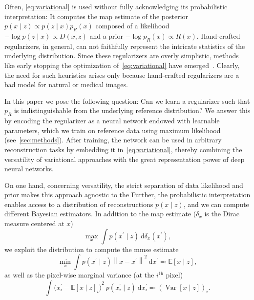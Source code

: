 \documentclass[twocolumn]{article}
\newcommand{\norm}[1]{\left\lVert#1\right\rVert}
\begin{document}
Often, \cref{eq:variational} is used without fully acknowledging its probabilistic interpretation:
It computes the \gls{map} estimate of the posterior \( p(x\mid z) \propto p(z \mid x) p_R(x) \) composed of a likelihood \( -\log p(z \mid x) \propto D(x, z) \) and a prior \( -\log p_R(x) \propto R(x) \).
Hand-crafted regularizers, in general, can not faithfully represent the intricate statistics of the underlying distribution.
Since these regularizers are overly simplistic, methods like early stopping the optimization of~\cref{eq:variational} have emerged~\cite{kobler_total_2020}.
Clearly, the need for such heuristics arises only because hand-crafted regularizers are a bad model for natural or medical images.

In this paper we pose the following question:
Can we learn a regularizer such that \( p_R \) is indistinguishable from the underlying reference distribution?
We answer this by encoding the regularizer as a neural network endowed with learnable parameters, which we train on reference data using maximum likelihood (see~\cref{sec:methods}).
After training, the network can be used in arbitrary reconstruction tasks by embedding it in~\cref{eq:variational}, thereby combining the versatility of variational approaches with the great representation power of deep neural networks.

On one hand, concerning versatility, the strict separation of data likelihood and prior makes this approach agnostic to the 
Further, the probabilistic interpretation enables access to a distribution of reconstructions \( p(x \mid z) \), and we can compute different Bayesian estimators.
In addition to the \gls{map} estimate (\( \delta_x \) is the Dirac measure centered at \( x \))
\begin{equation}
    \max_x \int p(x^\prime \mid z)\ \mathrm{d}\delta_x(x^\prime),
\end{equation}
we exploit the distribution to compute the \gls{mmse} estimate
\begin{equation}
    \min_x \int  p(x^\prime \mid z)\norm{x - x^\prime}^2 \ \mathrm{d}x^\prime \eqqcolon \mathbb{E}[x \mid z],%
    \label{eq:mmse}
\end{equation}
as well as the pixel-wise marginal variance (at the \( i^\text{th} \) pixel)
\begin{equation}
	\int {\big( x^\prime_i - \mathbb{E}{[x \mid z]}_i \big)}^2\ p(x^\prime_i\mid z)\ \mathrm{d}x^\prime_i \eqqcolon (\operatorname{Var}[x\mid z])_i.%
    \label{eq:variance}
\end{equation}
\end{document}
